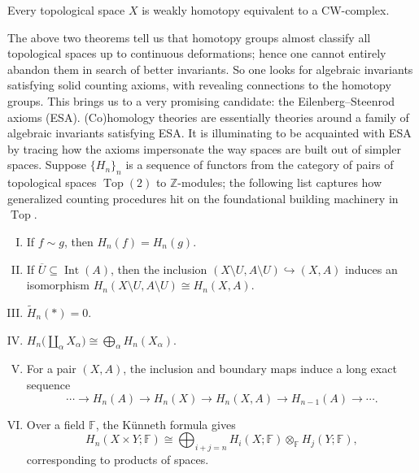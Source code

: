 \documentclass[11pt,a4paper]{article}
\begin{document}
\begin{theorem}[CW Approximation]
Every topological space $X$ is weakly homotopy equivalent to a CW-complex.
\end{theorem}


The above two theorems tell us that homotopy groups almost classify all topological spaces up to continuous deformations; hence one cannot entirely abandon them in search of better invariants. So one looks for algebraic invariants satisfying solid counting axioms, with revealing connections to the homotopy groups. This brings us to a very promising candidate: the Eilenberg--Steenrod axioms (ESA). (Co)homology theories are essentially theories around a family of algebraic invariants satisfying ESA. It is illuminating to be acquainted with ESA by tracing how the axioms impersonate the way spaces are built out of simpler spaces. Suppose $\{H_n\}_n$ is a sequence of functors from the category of pairs of topological spaces $\operatorname{Top}(2)$ to $\mathbb{Z}$-modules; the following list captures how generalized counting procedures hit on the foundational building machinery in $\operatorname{Top}$.


\begin{enumerate}[(I)]
    \item If $f\sim g$, then $H_n(f) = H_n(g)$.
    \item If $\overline U\subseteq \operatorname{Int}(A)$, then the inclusion $(X\setminus U,A\setminus U)\hookrightarrow(X,A)$ induces an isomorphism $H_n(X\setminus U, A\setminus U)\cong H_n(X, A)$.
    \item $\widetilde H_n(*) = 0$.
    \item $H_n\bigg(\coprod\limits_{\alpha}X_{\alpha}\bigg)\cong \bigoplus\limits_{\alpha}H_n(X_{\alpha})$.
    \item For a pair $(X,A)$, the inclusion and boundary maps induce a long exact sequence
    \[
    \cdots\longrightarrow H_n(A)\longrightarrow H_n(X)\longrightarrow H_n(X,A)\longrightarrow H_{n-1}(A)\longrightarrow\cdots.
    \]
    \item Over a field $\mathbb F$, the K\"unneth formula gives
    \[
    H_n(X\times Y;\mathbb F)\cong
    \bigoplus_{i+j=n}H_i(X;\mathbb F)\otimes_{\mathbb F}H_j(Y;\mathbb F),
    \]
    corresponding to products of spaces.
\end{enumerate}
\end{document}

